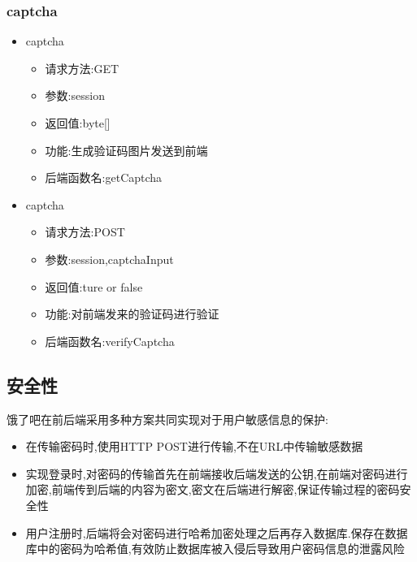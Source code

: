 \subsubsection*{captcha}
\begin{itemize}
 \item captcha
\begin{itemize}
    \item 请求方法:GET
    \item 参数:session
    \item 返回值:byte[]
    \item 功能:生成验证码图片发送到前端
    \item 后端函数名:getCaptcha
\end{itemize}

 \item captcha
\begin{itemize}
    \item 请求方法:POST
    \item 参数:session,captchaInput
    \item 返回值:ture or false
    \item 功能:对前端发来的验证码进行验证
    \item 后端函数名:verifyCaptcha
\end{itemize}
\end{itemize}






\subsection{安全性}
饿了吧在前后端采用多种方案共同实现对于用户敏感信息的保护:
\begin{itemize}
    \item 在传输密码时,使用HTTP POST进行传输,不在URL中传输敏感数据
    \item 实现登录时,对密码的传输首先在前端接收后端发送的公钥,在前端对密码进行加密,前端传到后端的内容为密文,密文在后端进行解密,保证传输过程的密码安全性
    \item 用户注册时,后端将会对密码进行哈希加密处理之后再存入数据库.保存在数据库中的密码为哈希值,有效防止数据库被入侵后导致用户密码信息的泄露风险
\end{itemize}


